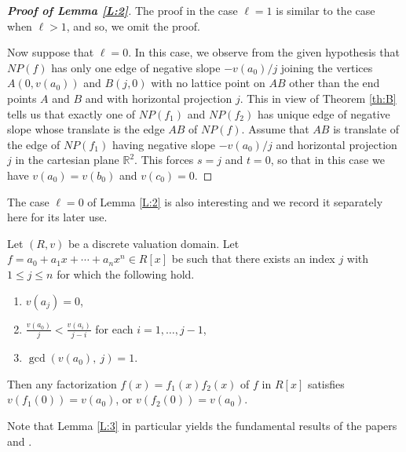 \documentclass[12pt]{amsart}%
\begin{document}
\begin{proof}[\bf Proof of Lemma \ref{L:2}]
The proof in the case $\ell=1$ is similar to the case when $\ell>1$, and so, we omit the proof.

Now suppose that $\ell=0$. In this case, we observe from the given hypothesis that $NP(f)$ has only one edge of negative slope $-v(a_0)/j$ joining the vertices $A(0,v(a_0))$ and $B(j,0)$ with no lattice point on $AB$ other than the end points $A$ and $B$ and with horizontal projection $j$. This in view of Theorem \ref{th:B} tells us that exactly one of $NP(f_1)$ and $NP(f_2)$ has unique edge of negative slope whose translate is the edge $AB$ of $NP(f)$. Assume that $AB$ is translate of the edge of $NP(f_1)$ having negative slope $-v(a_0)/j$ and horizontal projection $j$ in the cartesian plane $\mathbb{R}^2$. This forces $s=j$ and $t=0$, so that in this case we have  $v(a_0)=v(b_0)$ and $v(c_0)=0$. 
\end{proof}
The case $\ell=0$ of Lemma \ref{L:2} is also interesting and we record it separately here for its later use.
\begin{lemma}\label{L:3}
Let $(R,v)$  be a discrete valuation domain. Let $f=a_0 + a_1x + \cdots + a_nx^n \in {R}[x]$ be such that there exists an index  $j$  with $1\leq j\leq n$ for which the following hold.
\begin{enumerate}[label=$(\roman*)$]
\item $v(a_j)=0$,
\item $\frac{v(a_0)}{j}<\frac{v(a_i)}{j-i}$ for each $i=1,\ldots, j-1$,
\item $\gcd(v(a_0),~j) = 1$.
\end{enumerate}
Then any factorization $f(x)=f_1(x)f_2(x)$ of $f$ in $R[x]$ satisfies $v(f_1(0))=v(a_0)$, or $v(f_2(0))=v(a_0)$.
\end{lemma}
Note that Lemma \ref{L:3} in particular yields the fundamental results of the papers \cite[Lemma 1]{J-S-3} and  \cite[Lemma 1.4]{Bonciocat2013}.
\end{document}

